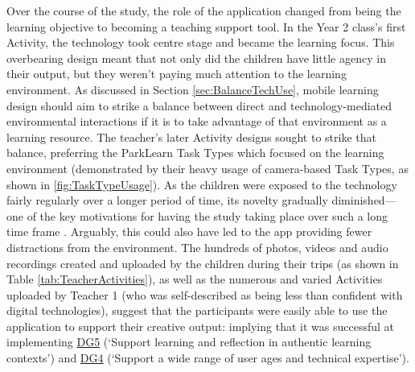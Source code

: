 Over the course of the study, the role of the application changed from being the learning objective to becoming a teaching support tool. In the Year 2 class’s first Activity, the technology took centre stage and became the learning focus. This overbearing design meant that not only did the children have little agency in their output, but they weren't paying much attention to the learning environment. As discussed in Section \ref{sec:BalanceTechUse}, mobile learning design should aim to strike a balance between direct and technology-mediated environmental interactions if it is to take advantage of that environment as a learning resource. The teacher’s later Activity designs sought to strike that balance, preferring the ParkLearn Task Types which focused on the learning environment (demonstrated by their heavy usage of camera-based Task Types, as shown in \ref{fig:TaskTypeUsage}). As the children were exposed to the technology fairly regularly over a longer period of time, its novelty  gradually diminished---one of the key motivations for having the study taking place over such a long time frame \citep{Sharples2013}. Arguably, this could also have led to the app providing fewer distractions from the environment. The hundreds of photos, videos and audio recordings created and uploaded by the children during their trips (as shown in Table \ref{tab:TeacherActivities}), as well as the numerous and varied Activities uploaded by Teacher 1 (who was self-described as being less than confident with digital technologies), suggest that the participants were easily able to use the application to support their creative output: implying that it was successful at implementing \hyperref[DG5]{DG5} (`Support learning and reflection in authentic learning contexts') and \hyperref[DG4]{DG4} (`Support a wide range of user ages and technical expertise').

